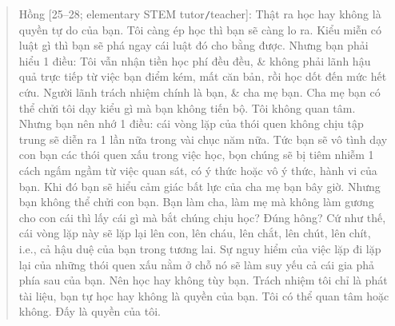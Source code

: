 \documentclass[12pt,twoside]{book}
\begin{document}
\begin{quote}
	{\sf Hồng [25--28; elementary STEM tutor{\tt/}teacher]}: Thật ra học hay không là quyền tự do của bạn. Tôi càng ép học thì bạn sẽ càng lo ra. Kiểu miễn có luật gì thì bạn sẽ phá ngay cái luật đó cho bằng được. Nhưng bạn phải hiểu 1 điều: Tôi vẫn nhận tiền học phí đều đều, \& không phải lãnh hậu quả trực tiếp từ việc bạn điểm kém, mất căn bản, rồi học dốt đến mức hết cứu. Người lãnh trách nhiệm chính là bạn, \& cha mẹ bạn. Cha mẹ bạn có thể chửi tôi dạy kiểu gì mà bạn không tiến bộ. Tôi không quan tâm. Nhưng bạn nên nhớ 1 điều: cái vòng lặp của thói quen không chịu tập trung sẽ diễn ra 1 lần nữa trong vài chục năm nữa. Tức bạn sẽ vô tình dạy con bạn các thói quen xấu trong việc học, bọn chúng sẽ bị tiêm nhiễm 1 cách ngấm ngầm từ việc quan sát, có ý thức hoặc vô ý thức, hành vi của bạn. Khi đó bạn sẽ hiểu cảm giác bất lực của cha mẹ bạn bây giờ. Nhưng bạn không thể chửi con bạn. Bạn làm cha, làm mẹ mà không làm gương cho con cái thì lấy cái gì mà bắt chúng chịu học? Đúng hông? Cứ như thế, cái vòng lặp này sẽ lặp lại lên con, lên cháu, lên chắt, lên chút, lên chít, i.e., cả hậu duệ của bạn trong tương lai. Sự nguy hiểm của việc lặp đi lặp lại của những thói quen xấu nằm ở chỗ nó sẽ làm suy yếu cả cái gia phả phía sau của bạn. Nên học hay không tùy bạn. Trách nhiệm tôi chỉ là phát tài liệu, bạn tự học hay không là quyền của bạn. Tôi có thể quan tâm hoặc không. Đấy là quyền của tôi.
\end{quote}
\end{document}
